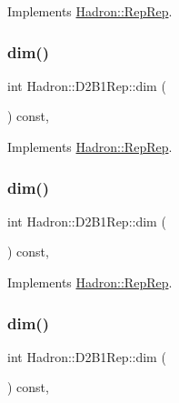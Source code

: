 Implements \mbox{\hyperlink{structHadron_1_1RepRep_a92c8802e5ed7afd7da43ccfd5b7cd92b}{Hadron\+::\+Rep\+Rep}}.

\mbox{\label{structHadron_1_1D2B1Rep_a73998a327da6c56b3478b3e356d512d8}} 
\subsubsection{\texorpdfstring{dim()}{dim()}\hspace{0.1cm}{\footnotesize\ttfamily [3/5]}}
{\footnotesize\ttfamily int Hadron\+::\+D2\+B1\+Rep\+::dim (\begin{DoxyParamCaption}{ }\end{DoxyParamCaption}) const\hspace{0.3cm}{\ttfamily [inline]}, {\ttfamily [virtual]}}



Implements \mbox{\hyperlink{structHadron_1_1RepRep_a92c8802e5ed7afd7da43ccfd5b7cd92b}{Hadron\+::\+Rep\+Rep}}.

\mbox{\label{structHadron_1_1D2B1Rep_a73998a327da6c56b3478b3e356d512d8}} 
\subsubsection{\texorpdfstring{dim()}{dim()}\hspace{0.1cm}{\footnotesize\ttfamily [4/5]}}
{\footnotesize\ttfamily int Hadron\+::\+D2\+B1\+Rep\+::dim (\begin{DoxyParamCaption}{ }\end{DoxyParamCaption}) const\hspace{0.3cm}{\ttfamily [inline]}, {\ttfamily [virtual]}}



Implements \mbox{\hyperlink{structHadron_1_1RepRep_a92c8802e5ed7afd7da43ccfd5b7cd92b}{Hadron\+::\+Rep\+Rep}}.

\mbox{\label{structHadron_1_1D2B1Rep_a73998a327da6c56b3478b3e356d512d8}} 
\subsubsection{\texorpdfstring{dim()}{dim()}\hspace{0.1cm}{\footnotesize\ttfamily [5/5]}}
{\footnotesize\ttfamily int Hadron\+::\+D2\+B1\+Rep\+::dim (\begin{DoxyParamCaption}{ }\end{DoxyParamCaption}) const\hspace{0.3cm}{\ttfamily [inline]}, {\ttfamily [virtual]}}



